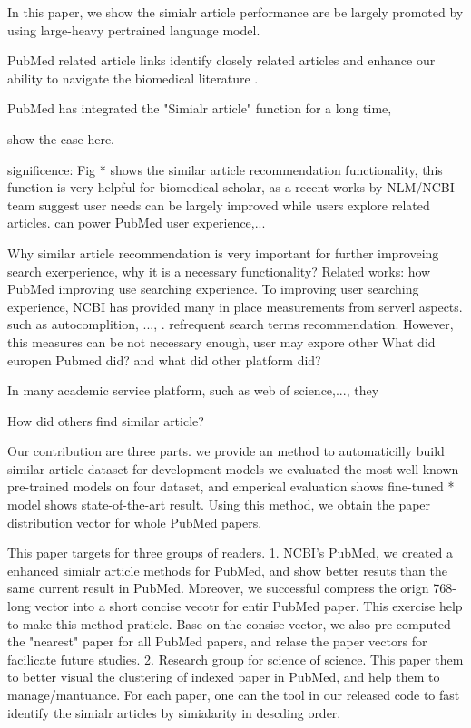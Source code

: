\documentclass[11pt]{article}
\begin{document}
    In this paper, we show the simialr article performance are be largely promoted by using large-heavy pertrained language model.

    PubMed related article links identify closely related articles and enhance our ability to navigate the biomedical literature \cite{Enriching2009}.

    PubMed has integrated the "Simialr article" function for a long time,

    show the case here.

    significence:
    Fig * shows the similar article recommendation functionality, this function is very helpful for biomedical scholar, as a recent works by NLM/NCBI team suggest user needs can be largely improved while users explore related articles.
    can power PubMed user experience,...

    Why similar article recommendation is very important for further improveing search exerperience, why it is a necessary functionality?
    Related works: how PubMed improving use searching experience. To improving user searching experience, NCBI has provided many in place measurements from serverl aspects.
    such as autocomplition, ..., . refrequent search terms recommendation. However, this measures can be not necessary enough, user may expore other
    What did europen Pubmed did? and what did other platform did?

    In many academic service platform, such as web of science,..., they

    How did others find similar article?

    Our contribution are three parts.
    we provide an method to automaticilly build similar article dataset for development models
    we evaluated the most well-known pre-trained models on four dataset, and emperical evaluation shows fine-tuned * model shows state-of-the-art result.
    Using this method, we obtain the paper distribution vector for whole PubMed papers.

    This paper targets for three groups of readers. 1. NCBI's PubMed, we created a enhanced simialr article methods for PubMed, and show better resuts than the same current result in PubMed. Moreover, we successful compress the orign 768-long vector into a short concise vecotr for entir PubMed paper.
    This exercise help to make this method praticle. Base on the consise vector, we also pre-computed the "nearest" paper for all PubMed papers, and relase the paper vectors for facilicate future studies.
    2. Research group for science of science. This paper them to better visual the clustering of indexed paper in PubMed, and help them to manage/mantuance. For each paper, one can the tool in our released code to fast identify the simialr articles by simialarity in descding order.
\end{document}
